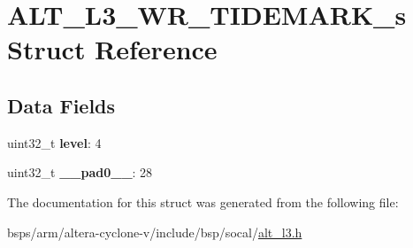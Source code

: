 \hypertarget{structALT__L3__WR__TIDEMARK__s}{}\section{A\+L\+T\+\_\+\+L3\+\_\+\+W\+R\+\_\+\+T\+I\+D\+E\+M\+A\+R\+K\+\_\+s Struct Reference}
\label{structALT__L3__WR__TIDEMARK__s}
\subsection*{Data Fields}
\begin{DoxyCompactItemize}
\item 
\mbox{\label{structALT__L3__WR__TIDEMARK__s_a3ddceba8bed794848d2cada3d5203dda}} 
uint32\+\_\+t {\bfseries level}\+: 4
\item 
\mbox{\label{structALT__L3__WR__TIDEMARK__s_af3d9ab4f04e01ac622e609e034ba95c3}} 
uint32\+\_\+t {\bfseries \+\_\+\+\_\+pad0\+\_\+\+\_\+}\+: 28
\end{DoxyCompactItemize}


The documentation for this struct was generated from the following file\+:\begin{DoxyCompactItemize}
\item 
bsps/arm/altera-\/cyclone-\/v/include/bsp/socal/\mbox{\hyperlink{alt__l3_8h}{alt\+\_\+l3.\+h}}\end{DoxyCompactItemize}
